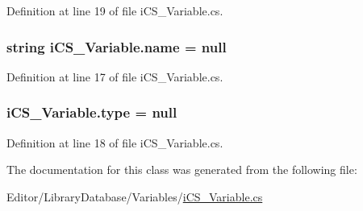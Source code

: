 Definition at line 19 of file i\+C\+S\+\_\+\+Variable.\+cs.

\hypertarget{classi_c_s___variable_aeffa83ae5b7ea919a0d63568d592d2d9}{
\subsubsection[{name}]{\setlength{\rightskip}{0pt plus 5cm}string i\+C\+S\+\_\+\+Variable.\+name = null}}\label{classi_c_s___variable_aeffa83ae5b7ea919a0d63568d592d2d9}


Definition at line 17 of file i\+C\+S\+\_\+\+Variable.\+cs.

\hypertarget{classi_c_s___variable_a12f508d9b7ec71391a2bf72e2644ccce}{
\subsubsection[{type}]{ i\+C\+S\+\_\+\+Variable.\+type = null}}\label{classi_c_s___variable_a12f508d9b7ec71391a2bf72e2644ccce}


Definition at line 18 of file i\+C\+S\+\_\+\+Variable.\+cs.



The documentation for this class was generated from the following file\+:\begin{DoxyCompactItemize}
\item 
Editor/\+Library\+Database/\+Variables/\hyperlink{i_c_s___variable_8cs}{i\+C\+S\+\_\+\+Variable.\+cs}\end{DoxyCompactItemize}
